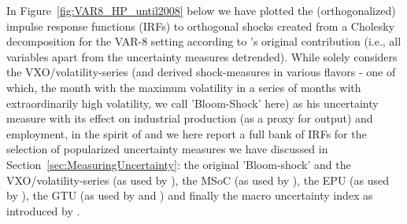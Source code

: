 \documentclass[a4paper,12pt,oneside,pointednumbers,bibtotoc,bigheadings,liststotoc]{scrbook}
\begin{document}
In Figure~\ref{fig:VAR8_HP_until2008} below we have plotted the (orthogonalized) impulse response functions (IRFs) to orthogonal shocks created from a Cholesky decomposition for the VAR-8 setting according to \citet{bloom:09}'s original contribution (i.e., all variables apart from the uncertainty measures detrended). While \citet{bloom:09} solely considers the VXO/volatility-series (and derived shock-measures in various flavors - one of which, the month with the maximum volatility in a series of months with extraordinarily high volatility, we call 'Bloom-Shock' here) as his uncertainty measure with its effect on industrial production (as a proxy for output) and employment, in the spirit of \citet{juradoetal:15} and \citet{bontempietal:16} we here report a full bank of IRFs for the selection of popularized uncertainty measures we have discussed in Section~\ref{sec:MeasuringUncertainty}: the original 'Bloom-shock' and the VXO/volatility-series (as used by \citealp{bloom:09}), the MSoC (as used by \citealp{leducandliu:16}), the EPU (as used by \citealp{bakeretal:15}), the GTU (as used by \citealp{bontempietal:16} and \citealp{castelnuovoandtran:17}) and finally the macro uncertainty index as introduced by \citet{juradoetal:15}.
\end{document}

